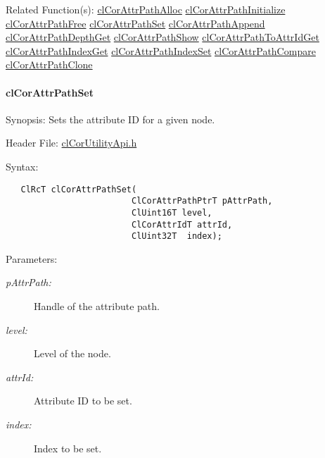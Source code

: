 \begin{Desc}
\item[Related Function(s):]\hyperlink{group__group13}{cl\-Cor\-Attr\-Path\-Alloc} \hyperlink{group__group13}{cl\-Cor\-Attr\-Path\-Initialize} \hyperlink{group__group13}{cl\-Cor\-Attr\-Path\-Free} \hyperlink{group__group13}{cl\-Cor\-Attr\-Path\-Set} \hyperlink{group__group13}{cl\-Cor\-Attr\-Path\-Append} \hyperlink{group__group13}{cl\-Cor\-Attr\-Path\-Depth\-Get} \hyperlink{group__group13}{cl\-Cor\-Attr\-Path\-Show} \hyperlink{group__group13}{cl\-Cor\-Attr\-Path\-To\-Attr\-Id\-Get} \hyperlink{group__group13}{cl\-Cor\-Attr\-Path\-Index\-Get} \hyperlink{group__group13}{cl\-Cor\-Attr\-Path\-Index\-Set} \hyperlink{group__group13}{cl\-Cor\-Attr\-Path\-Compare} \hyperlink{group__group13}{cl\-Cor\-Attr\-Path\-Clone} \end{Desc}
\hypertarget{pagecor259}{}\paragraph{cl\-Cor\-Attr\-Path\-Set}\label{pagecor259}
\begin{Desc}
\item[Synopsis:]Sets the attribute ID for a given node.\end{Desc}
\begin{Desc}
\item[Header File:]\hyperlink{cl_cor_utility_api_8h}{cl\-Cor\-Utility\-Api.h}\end{Desc}
\begin{Desc}
\item[Syntax:]

\footnotesize\begin{verbatim}   ClRcT clCorAttrPathSet(
                         ClCorAttrPathPtrT pAttrPath,
                         ClUint16T level,
                         ClCorAttrIdT attrId,
                         ClUint32T  index);
\end{verbatim}
\normalsize
\end{Desc}
\begin{Desc}
\item[Parameters:]
\begin{description}
\item[{\em p\-Attr\-Path:}]Handle of the attribute path. \item[{\em level:}]Level of the node. \item[{\em attr\-Id:}]Attribute ID to be set. \item[{\em index:}]Index to be set.\end{description}
\end{Desc}
